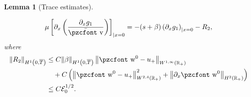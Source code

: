\documentclass[10pt]{amsart}
\newtheorem{lemm}[theo]{Lemma}\newtheorem{prop}[theo]{Proposition}\newtheorem{coro}[theo]{Corollary}\newtheorem{conj}[theo]{Conjecture}
\theoremstyle{definition}\newtheorem{defi}[theo]{Definition}\newtheorem{rema}[theo]{Remark}\newtheorem{exam}[theo]{Example}\newtheorem{exem}[theo]{Example}\newtheorem{nota}[theo]{Notation}
\newcommand{\mathpzc}[1]{\text{\pzcfont #1}}
\newcommand{\R}{\mathbb{R}}
\newcommand{\p}{\partial}
\newcommand{\bv}{\bar{\mathpzc{v}}}
\newcommand{\cE}{\mathcal E}
\newcommand{\tw}{\mathpzc{w}}
\begin{document}
\begin{lemm}[Trace estimates]
\begin{enumerate}
\begin{equation}
\mu \left[\partial_x \left(\dfrac{\partial_x g_1}{\bv}\right) \right]_{|x=0} = -(s+\beta)\left(\partial_x g_1\right)_{|x=0} - R_2,
\end{equation}
where
\begin{equation}\label{est:R2}
\begin{aligned}
\|R_2\|_{H^1\left(0,\overline{T}\right)}&\leq C \|\beta\|_{H^1\left(0, \overline{T}\right)}\left\|\tw^0-u_+\right\|_{W^{1,\infty}(\R_+)}
\\
&\quad + C\left(\left\| \tw^0-u_+\right\|_{W^{2,4}(\R_+)}^2 + \left\|\p_x \tw^0\right\|_{H^2(\R_+)} \right)\\
&\leq C \cE_0^{1/2}.
\end{aligned}
\end{equation}
\end{enumerate}
\end{lemm}
\end{document}
